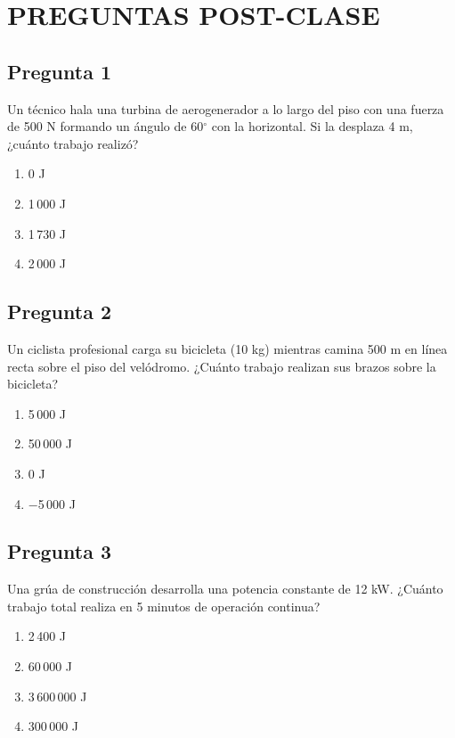 \renewcommand{\tema}{Preguntas Post-Clase - Trabajo y Leyes de la Conservación}

\twocolumn
\section{PREGUNTAS POST-CLASE}


\begin{preguntabox}
\subsection{Pregunta 1}
Un técnico hala una turbina de aerogenerador a lo largo del piso con una fuerza de 500 N formando un ángulo de 60$^\circ$ con la horizontal. Si la desplaza 4 m, ¿cuánto trabajo realizó?

\begin{enumerate}
    \item[A)] 0 J
    \item[B)] 1\,000 J
    \item[C)] 1\,730 J
    \item[D)] 2\,000 J
\end{enumerate}
\end{preguntabox}

\begin{preguntabox}
\subsection{Pregunta 2}
Un ciclista profesional carga su bicicleta (10 kg) mientras camina 500 m en línea recta sobre el piso del velódromo. ¿Cuánto trabajo realizan sus brazos sobre la bicicleta?

\begin{enumerate}
    \item[A)] 5\,000 J
    \item[B)] 50\,000 J
    \item[C)] 0 J
    \item[D)] $-$5\,000 J
\end{enumerate}
\end{preguntabox}

\begin{preguntabox}
\subsection{Pregunta 3}
Una grúa de construcción desarrolla una potencia constante de 12 kW. ¿Cuánto trabajo total realiza en 5 minutos de operación continua?

\begin{enumerate}
    \item[A)] 2\,400 J
    \item[B)] 60\,000 J
    \item[C)] 3\,600\,000 J
    \item[D)] 300\,000 J
\end{enumerate}
\end{preguntabox}

